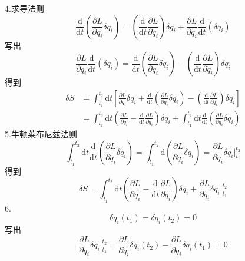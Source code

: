 4.求导法则
\begin{equation}
    \frac{\mathrm{d}}{\mathrm{d}t}\left( \frac{\partial L}{\partial \dot{q}_i}\delta q_i \right) =\left( \frac{\mathrm{d}}{\mathrm{d}t}\frac{\partial L}{\partial \dot{q}_i} \right) \delta q_i+\frac{\partial L}{\partial \dot{q}_i}\frac{\mathrm{d}}{\mathrm{d}t}\left( \delta q_i \right) 
\end{equation}
写出
\begin{equation}
    \frac{\partial L}{\partial \dot{q}_i}\frac{\mathrm{d}}{\mathrm{d}t}\left( \delta q_i \right) =\frac{\mathrm{d}}{\mathrm{d}t}\left( \frac{\partial L}{\partial \dot{q}_i}\delta q_i \right) -\left( \frac{\mathrm{d}}{\mathrm{d}t}\frac{\partial L}{\partial \dot{q}_i} \right) \delta q_i
\end{equation}
得到
\begin{equation}
    \begin{aligned}
        \delta S&=\int_{t_1}^{t_2}{\mathrm{d}t}\left[ \frac{\partial L}{\partial q_i}\delta q_i+\frac{\mathrm{d}}{\mathrm{d}t}\left( \frac{\partial L}{\partial \dot{q}_i}\delta q_i \right) -\left( \frac{\mathrm{d}}{\mathrm{d}t}\frac{\partial L}{\partial \dot{q}_i} \right) \delta q_i \right] 
\\
&=\int_{t_1}^{t_2}{\mathrm{d}t}\left( \frac{\partial L}{\partial q_i}-\frac{\mathrm{d}}{\mathrm{d}t}\frac{\partial L}{\partial \dot{q}_i} \right) \delta q_i+\int_{t_1}^{t_2}{\mathrm{d}t}\frac{\mathrm{d}}{\mathrm{d}t}\left( \frac{\partial L}{\partial \dot{q}_i}\delta q_i \right) 
    \end{aligned}
\end{equation}
5.牛顿莱布尼兹法则
\begin{equation}
    \int_{t_1}^{t_2}{\mathrm{d}t}\frac{\mathrm{d}}{\mathrm{d}t}\left( \frac{\partial L}{\partial \dot{q}_i}\delta q_i \right) =\int_{t_1}^{t_2}{\mathrm{d}\left( \frac{\partial L}{\partial \dot{q}_i}\delta q_i \right)}=\frac{\partial L}{\partial \dot{q}_i}\delta q_i|_{t_1}^{t_2}
\end{equation}
得到
\begin{equation}
    \delta S=\int_{t_1}^{t_2}{\mathrm{d}t}\left( \frac{\partial L}{\partial q_i}-\frac{\mathrm{d}}{\mathrm{d}t}\frac{\partial L}{\partial \dot{q}_i} \right) \delta q_i+\frac{\partial L}{\partial \dot{q}_i}\delta q_i|_{t_1}^{t_2}
\end{equation}
6.
\begin{equation}
    \delta q_i(t_1)=\delta q_i(t_2)=0
\end{equation}
写出
\begin{equation}
    \frac{\partial L}{\partial \dot{q}_i}\delta q_i|_{t_1}^{t_2}=\frac{\partial L}{\partial \dot{q}_i}\delta q_i(t_2)-\frac{\partial L}{\partial \dot{q}_i}\delta q_i(t_1)=0
\end{equation}
